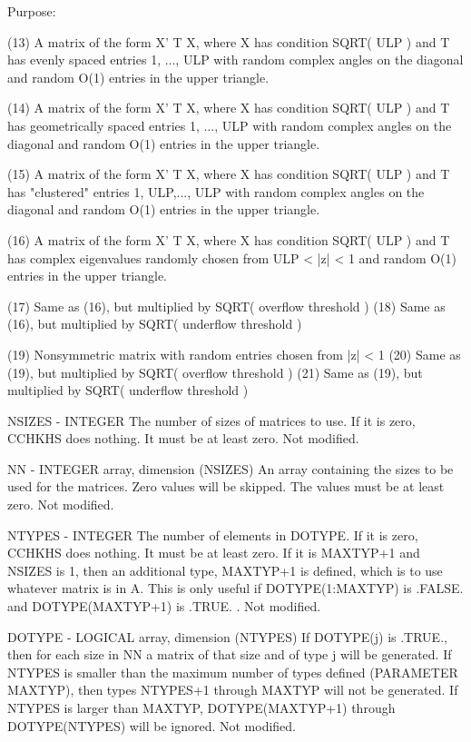 \begin{DoxyParagraph}{Purpose\+: }
\begin{DoxyVerb}
    (13) A matrix of the form  X' T X, where X has condition
         SQRT( ULP ) and T has evenly spaced entries 1, ..., ULP
         with random complex angles on the diagonal and random O(1)
         entries in the upper triangle.

    (14) A matrix of the form  X' T X, where X has condition
         SQRT( ULP ) and T has geometrically spaced entries
         1, ..., ULP with random complex angles on the diagonal
         and random O(1) entries in the upper triangle.

    (15) A matrix of the form  X' T X, where X has condition
         SQRT( ULP ) and T has "clustered" entries 1, ULP,..., ULP
         with random complex angles on the diagonal and random O(1)
         entries in the upper triangle.

    (16) A matrix of the form  X' T X, where X has condition
         SQRT( ULP ) and T has complex eigenvalues randomly chosen
         from   ULP < |z| < 1   and random O(1) entries in the upper
         triangle.

    (17) Same as (16), but multiplied by SQRT( overflow threshold )
    (18) Same as (16), but multiplied by SQRT( underflow threshold )

    (19) Nonsymmetric matrix with random entries chosen from |z| < 1
    (20) Same as (19), but multiplied by SQRT( overflow threshold )
    (21) Same as (19), but multiplied by SQRT( underflow threshold )\end{DoxyVerb}
 \begin{DoxyVerb}  NSIZES - INTEGER
           The number of sizes of matrices to use.  If it is zero,
           CCHKHS does nothing.  It must be at least zero.
           Not modified.

  NN     - INTEGER array, dimension (NSIZES)
           An array containing the sizes to be used for the matrices.
           Zero values will be skipped.  The values must be at least
           zero.
           Not modified.

  NTYPES - INTEGER
           The number of elements in DOTYPE.   If it is zero, CCHKHS
           does nothing.  It must be at least zero.  If it is MAXTYP+1
           and NSIZES is 1, then an additional type, MAXTYP+1 is
           defined, which is to use whatever matrix is in A.  This
           is only useful if DOTYPE(1:MAXTYP) is .FALSE. and
           DOTYPE(MAXTYP+1) is .TRUE. .
           Not modified.

  DOTYPE - LOGICAL array, dimension (NTYPES)
           If DOTYPE(j) is .TRUE., then for each size in NN a
           matrix of that size and of type j will be generated.
           If NTYPES is smaller than the maximum number of types
           defined (PARAMETER MAXTYP), then types NTYPES+1 through
           MAXTYP will not be generated.  If NTYPES is larger
           than MAXTYP, DOTYPE(MAXTYP+1) through DOTYPE(NTYPES)
           will be ignored.
           Not modified.


\end{DoxyVerb}
\end{DoxyParagraph}
